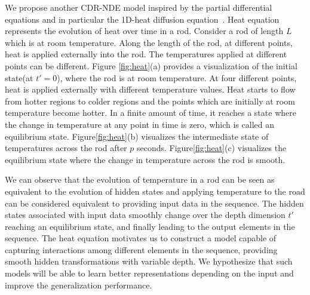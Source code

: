 \documentclass{article} %
\begin{document}
We propose another CDR-NDE model inspired by the partial differential equations and in particular the 1D-heat diffusion equation~\citep{cannon1984one}. Heat equation represents the evolution of heat over time in a rod. Consider a rod of length $L$ which is at room temperature. Along the length of the rod, at different points, heat is applied externally into the rod. The temperatures applied at different points can be different. Figure \ref{fig:heat}(a) provides a visualization of the initial state(at $t'=0$), where the rod is at room temperature. At four different points, heat is applied externally with different temperature values. Heat starts to flow from hotter regions to colder regions and the points which are initially at room temperature become hotter. In a finite amount of time, it reaches a state where the change in temperature at any point in time is zero, which is  called an equilibrium state. Figure\ref{fig:heat}(b) visualizes the intermediate state of temperatures across the rod after $p$ seconds. Figure\ref{fig:heat}(c) visualizes the equilibrium state where the change in temperature across the rod is smooth.

We can observe that the evolution of  temperature in a rod can be seen as equivalent to the evolution of hidden states and applying temperature to the road  can be  considered equivalent to providing input data in the sequence. The hidden states associated with input data smoothly change over the depth dimension $t'$ reaching an equilibrium state, and finally leading to the output elements in the sequence.  The heat equation motivates us to construct a model capable of capturing interactions among different elements in the sequence, providing smooth hidden transformations with variable depth. We hypothesize that such models will be able to learn better representations depending on the input and improve the generalization performance. 
\end{document}
